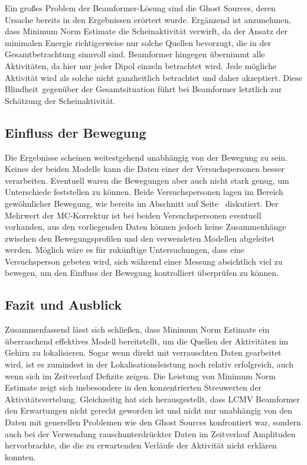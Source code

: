 \documentclass[doc,a4paper,12pt]{apa6}
\makeatletter
\DeclareRobustCommand*{\nameref}[1]{%
      \glqq{\myorg@nameref{#1}}\grqq%
    }%
\makeatother
\begin{document}
Ein großes Problem der Beamformer-Lösung sind die Ghost Sources, deren Ursache bereits in den Ergebnissen erörtert wurde. Ergänzend ist anzunehmen, dass Minimum Norm Estimate die Scheinaktivität verwirft, da der Ansatz der minimalen Energie richtigerweise nur solche Quellen bevorzugt, die in der Gesamtbetrachtung sinnvoll sind. Beamformer hingegen übernimmt alle Aktivitäten, da hier nur jeder Dipol einzeln betrachtet wird. Jede mögliche Aktivität wird als solche nicht ganzheitlich betrachtet und daher akzeptiert. Diese \glqq Blindheit\grqq ~gegenüber der Gesamtsituation führt bei Beamformer letztlich zur Schätzung der Scheinaktivität.

\subsection{Einfluss der Bewegung}

Die Ergebnisse scheinen weitestgehend unabhängig von der Bewegung zu sein. Keines der beiden Modelle kann die Daten einer der Versuchspersonen besser verarbeiten. Eventuell waren die Bewegungen aber auch nicht stark genug, um Unterschiede feststellen zu können. Beide Versuchspersonen lagen im Bereich gewöhnlicher Bewegung, wie bereits im Abschnitt \nameref{sec:ergebnis-vorverarbeitung} auf Seite~\pageref{sec:ergebnis-vorverarbeitung} diskutiert. Der Mehrwert der MC-Korrektur ist bei beiden Versuchspersonen eventuell vorhanden, aus den vorliegenden Daten können jedoch keine Zusammenhänge zwischen den Bewegungsprofilen und den verwendeten Modellen abgeleitet werden. Möglich wäre es für zukünftige Untersuchungen, dass eine Versuchsperson gebeten wird, sich während einer Messung absichtlich viel zu bewegen, um den Einfluss der Bewegung kontrolliert überprüfen zu können.

\subsection{Fazit und Ausblick}

Zusammenfassend lässt sich schließen, dass Minimum Norm Estimate ein überraschend effektives Modell bereitstellt, um die Quellen der Aktivitäten im Gehirn zu lokalisieren. Sogar wenn direkt mit verrauschten Daten gearbeitet wird, ist es zumindest in der Lokalisationsleistung noch relativ erfolgreich, auch wenn sich im Zeitverlauf Defizite zeigen. Die Leistung von Minimum Norm Estimate zeigt sich insbesondere in den konzentrierten Streuwerten der Aktivitätsvertelung. Gleichzeitig hat sich herausgestellt, dass LCMV Beamformer den Erwartungen nicht gerecht geworden ist und nicht nur unabhängig von den Daten mit generellen Problemen wie den Ghost Sources konfrontiert war, sondern auch bei der Verwendung rauschunterdrückter Daten im Zeitverlauf Amplituden hervorbrachte, die die zu erwartenden Verläufe der Aktivität nicht erklären konnten.
\end{document}
